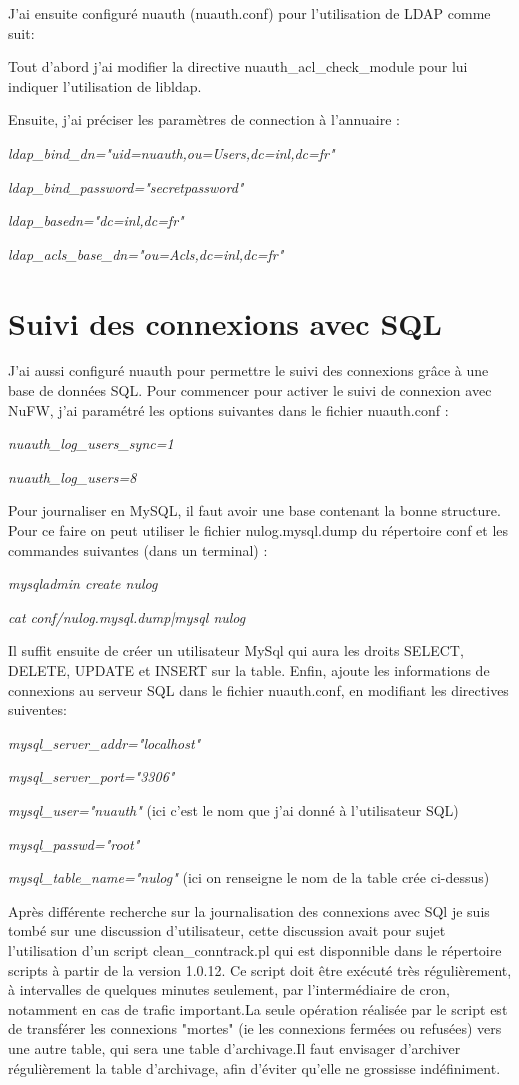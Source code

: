 \documentclass[12pt]{report}
\begin{document}
\begin{itemize}
J'ai ensuite configuré nuauth (nuauth.conf) pour l'utilisation de LDAP comme suit:

Tout d'abord j'ai modifier la directive nuauth\_acl\_check\_module pour lui indiquer l'utilisation de libldap.

Ensuite, j'ai préciser les paramètres de connection à l’annuaire :

\textit{ldap\_bind\_dn="uid=nuauth,ou=Users,dc=inl,dc=fr"}

\textit{ldap\_bind\_password="secretpassword"}

\textit{ldap\_basedn="dc=inl,dc=fr"}

\textit{ldap\_acls\_base\_dn="ou=Acls,dc=inl,dc=fr"}

\section{Suivi des connexions avec SQL}
J'ai aussi configuré nuauth pour permettre le suivi des connexions grâce à une base de données SQL. Pour commencer pour 
activer le suivi de connexion avec NuFW, j'ai paramétré les options suivantes dans le fichier nuauth.conf :

\textit{nuauth\_log\_users\_sync=1}

\textit{nuauth\_log\_users=8}

Pour journaliser en MySQL, il faut avoir une base contenant la bonne structure. Pour ce faire on peut utiliser 
le fichier nulog.mysql.dump du répertoire conf et les commandes suivantes (dans un terminal) :

\textit{mysqladmin create nulog}

\textit{cat conf/nulog.mysql.dump|mysql nulog}

Il suffit ensuite de créer un utilisateur MySql qui aura les droits SELECT, DELETE, UPDATE et INSERT sur la table. Enfin, ajoute 
les informations de connexions au serveur SQL dans le fichier nuauth.conf, en modifiant les directives suiventes:

\textit{mysql\_server\_addr="localhost"}

\textit{mysql\_server\_port="3306"}

\textit{mysql\_user="nuauth"} (ici c'est le nom que j'ai donné à l'utilisateur SQL)

\textit{mysql\_passwd="root"}

\textit{mysql\_table\_name="nulog"} (ici on renseigne le nom de la table crée ci-dessus)

Après différente recherche sur la journalisation des connexions avec SQl je suis tombé sur une discussion d'utilisateur, 
cette discussion avait pour sujet l'utilisation d'un script clean\_conntrack.pl qui est disponnible dans le répertoire scripts 
à partir de la version 1.0.12. 
Ce script doit être exécuté très régulièrement, à intervalles de quelques minutes seulement, par l’intermédiaire de cron, 
notamment en cas de trafic important.La seule opération réalisée par le script est de transférer les connexions "mortes" 
(ie les connexions fermées ou refusées) vers une autre table, qui sera une table d’archivage.Il faut envisager d’archiver 
régulièrement la table d'archivage, afin d’éviter qu’elle ne grossisse indéfiniment.


\end{itemize}
\end{document}
